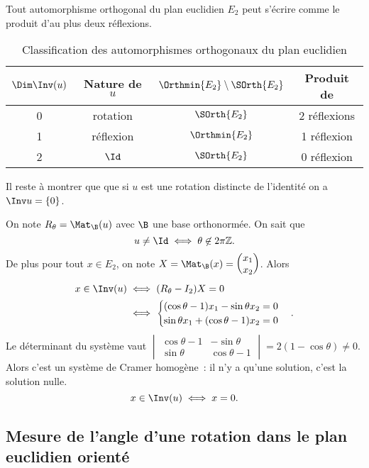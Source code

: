 \begin{theo}
  Tout automorphisme orthogonal du plan euclidien $E_2$ peut s'écrire comme le produit d'au plus deux réflexions.
  \begin{table}[!h]
    \centering
    \begin{tabular}{|c|c|c|c|}\hline
      $\Dim\Inv(u)$ & Nature de $u$ & $\Orthmin{E_2}\setminus\SOrth{E_2}$& Produit de \\ \hline
      0 & rotation & $\SOrth{E_2}$ & 2 réflexions \\
      1 & réflexion & $\Orthmin{E_2}$ & 1 réflexion \\
      2 & $\Id$ & $\SOrth{E_2}$ & 0 réflexion \\ \hline
    \end{tabular}
    \caption{Classification des automorphismes orthogonaux du plan euclidien}
    \label{tab:ClassOrth}
  \end{table}
\end{theo}

Il reste à montrer que  que si $u$ est une rotation distincte de l'identité on a $\Inv u =\{0\}$. 

On note $R_\theta=\Mat_\B(u)$ avec $\B$ une base orthonormée. On sait que
\begin{equation}
  u \neq \Id \iff \theta \not\in 2\pi\Z.
\end{equation}
De plus pour tout $x \in E_2$, on note $X=\Mat_\B(x)=\begin{pmatrix} x_1 \\ x_2 \end{pmatrix}$. Alors
\begin{align}
  x \in \Inv(u) &\iff (R_\theta-I_2)X=0 \\
  &\iff \begin{cases} (\cos\theta -1)x_1 -\sin\theta x_2 = 0 \\ \sin\theta x_1 +(\cos\theta -1)x_2=0 \end{cases}.
\end{align}
Le déterminant du système vaut $\begin{vmatrix} \cos\theta -1 & -\sin\theta \\ \sin\theta & \cos\theta -1\end{vmatrix} = 2(1-\cos\theta)\neq 0$. Alors c'est un système de Cramer homogène~: il n'y a qu'une solution, c'est la solution nulle.
\begin{equation}
  x \in \Inv(u) \iff x=0.
\end{equation}

\subsection{Mesure de l'angle d'une rotation dans le plan euclidien orienté}

